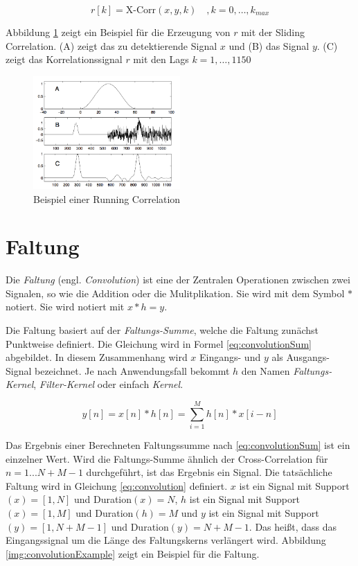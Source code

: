\begin{equation}
r[k] = \text{X-Corr}(x,y,k) \quad, k = 0 , \ldots , k_{max} 
\label{eq:runningCorrelation}
\end{equation}

Abbildung \ref{img:slidingCorrelation} zeigt ein Beispiel für die Erzeugung von $r$ mit der Sliding Correlation. (A) zeigt das zu detektierende Signal $x$ und (B) das Signal $y$. (C) zeigt das Korrelationssignal $r$ mit den Lags $k = 1, \ldots ,1150$ \cite[S. 47 - 48]{dspMichigan}

\begin{figure}[h]
	\centering
	\includegraphics[width=0.5\textwidth]{bilder/slidingCorrelation.png}
	\caption{Beispiel einer Running Correlation}
	\label{img:slidingCorrelation}
\end{figure}

\section{Faltung}

Die \emph{Faltung} (engl. \emph{Convolution}) ist eine der Zentralen Operationen zwischen zwei Signalen, so wie die Addition oder die Mulitplikation. Sie wird mit dem Symbol $*$ notiert. Sie wird notiert mit $x* h = y$. 

Die Faltung basiert auf der \emph{Faltungs-Summe}, welche die Faltung zunächst Punktweise definiert. Die Gleichung wird in Formel \ref{eq:convolutionSum} abgebildet. In diesem Zusammenhang wird $x$ Eingangs- und $y$ als Ausgangs-Signal bezeichnet. Je nach Anwendungsfall bekommt $h$ den Namen \emph{Faltungs-Kernel}, \emph{Filter-Kernel} oder einfach \emph{Kernel}. \cite[S. 107-108]{dspGuide}

\begin{equation}
y[n] = x[n] * h[n] = \sum_{i=1}^{M} h[n] * x[i-n]
\label{eq:convolutionSum}
\end{equation}

Das Ergebnis einer Berechneten Faltungssumme nach \ref{eq:convolutionSum} ist ein einzelner Wert. Wird die Faltungs-Summe ähnlich der Cross-Correlation für $n = 1...N+M-1$ durchgeführt, ist das Ergebnis ein Signal. Die tatsächliche Faltung wird in Gleichung \ref{eq:convolution} definiert. $x$ ist ein Signal mit Support$(x) = [1,N]$ und Duration$(x) = N$, $h$ ist ein Signal mit Support$(x) = [1,M]$ und Duration$(h) = M$ und $y$ ist ein Signal mit Support$(y) = [1,N+M-1]$ und Duration$(y) = N+M-1$. Das heißt, dass das Eingangssignal um die Länge des Faltungskerns verlängert wird. Abbildung 	\ref{img:convolutionExample} zeigt ein Beispiel für die Faltung.\cite[S. 115-120]{dspGuide}

